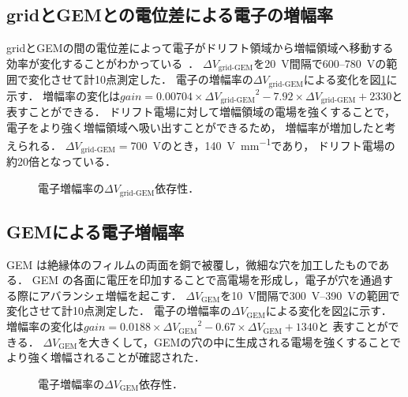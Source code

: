 \documentclass[../master]{subfiles}
\begin{document}
\subsection{gridとGEMとの電位差による電子の増幅率}
gridとGEMの間の電位差によって電子がドリフト領域から増幅領域へ移動する効率が変化することがわかっている~\cite{furuno}．
$\Delta V_{\text{grid-GEM}}$を\SI{20}{\volt}間隔で\SI{600}{}--\SI{780}{\volt}の範囲で変化させて計10点測定した．
電子の増幅率の$\Delta V_{\text{grid-GEM}}$による変化を図\ref{fig::gain_grid_GEM_V_dep}に示す．
増幅率の変化は$\mathit{gain} = 0.00704\times{\Delta V_{\text{grid-GEM}}}^2-7.92\times{\Delta V_{\text{grid-GEM}}}+2330$と
表すことができる．
ドリフト電場に対して増幅領域の電場を強くすることで，電子をより強く増幅領域へ吸い出すことができるため，
増幅率が増加したと考えられる．
$\Delta V_{\text{grid-GEM}} = $\SI{700}{\volt}のとき，\SI{140}{\volt\per\milli\metre}であり，
ドリフト電場の約20倍となっている．
\begin{figure}
  \centering
  \scalebox{0.7}{}
  \caption{電子増幅率の$\Delta V_{\text{grid-GEM}}$依存性．}
  \label{fig::gain_grid_GEM_V_dep}
\end{figure}

\subsection{GEMによる電子増幅率}
GEM は絶縁体のフィルムの両面を銅で被覆し，微細な穴を加工したものである．
GEM の各面に電圧を印加することで高電場を形成し，電子が穴を通過する際にアバランシェ増幅を起こす．
$\Delta V_{\text{GEM}}$を\SI{10}{\volt}間隔で\SIrange{300}{390}{\volt}の範囲で変化させて計10点測定した．
電子の増幅率の$\Delta V_{\text{GEM}}$による変化を図\ref{fig::gain_GEM_V_dep}に示す．
増幅率の変化は$\mathit{gain} = 0.0188\times{\Delta V_{\text{GEM}}}^2-0.67\times{\Delta V_{\text{GEM}}}+1340$と
表すことができる．
$\Delta V_{\text{GEM}}$を大きくして，GEMの穴の中に生成される電場を強くすることでより強く増幅されることが確認された．
\begin{figure}
  \centering
  \scalebox{0.7}{}
  \caption{電子増幅率の$\Delta V_{\text{GEM}}$依存性．}
  \label{fig::gain_GEM_V_dep}
\end{figure}
\end{document}
